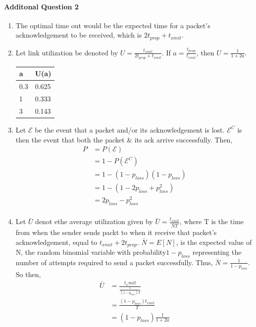 \documentclass[12pt]{article}
\begin{document}
\paragraph{Additonal Question 2}
\begin{enumerate}[label=\textbf{Part \alph*)},leftmargin=*,align=left]
	\item The optimal time out would be the expected time for a packet's acknowledgement to be received, which is $2t_{prop} + t_{xmit}$.
	\item Let link utilization be denoted by $U = \frac{t_{xmit}}{2t_{prop} + t_{xmit}}$. If $a = \frac{t_{prop}}{t_{xmit}}$, then $U = \frac{1}{1 + 2a}$. 
		\begin{tabular}{ | l | l | }
			\hline
			a & U(a) \\ \hline
			0.3 &  0.625 \\ \hline
			1    &  0.333 \\ \hline
			3    &  0.143	\\ \hline
		\end{tabular}
	\item Let $\mathcal{E}$ be the event that a packet and/or its acknowledgement is lost. $\mathcal{E}^C$ is then the event that both the packet \& its ack arrive successfully. Then,
		\begin{align*}
			P & = P (\mathcal{E}) \\
			& = 1 - P( \mathcal{E}^C) \\
			& = 1 - (1 - p_{loss})( 1 - p_{loss} ) \\
			& = 1 - ( 1 - 2p_{loss} + p_{loss}^2 ) \\
			& = 2p_{loss} - p_{loss}^2\\
		\end{align*}
	\item Let $\bar{U}$ denot ethe average utilization given by $\bar{U} = \frac{t_{xmit}}{\bar{N}T}$, where T is the time from when the sender sends packt to when it receive that packet's acknowledgement, equal to $t_{xmit} + 2t_{prop}$. $\bar{N} = E[N]$, is the expected value of N, the random binomial variable with probability$1 - p_{loss}$ representing the number of attempts required to send a packet successfully. Thus, $\bar{N} = \frac{1}{1-p_{loss}}$. So then,
		\begin{align*}
			\bar{U} & = \frac{t_xmit}{\frac{ 1 }{ (1 - p_{loss})T } } \\
				       & = \frac{ ( 1 - p_{loss})t_{xmit} }{ T } \\
				       & = ( 1 - p_{loss} )\frac{ 1 }{ 1 + 2a } \\

\end{align*}
\end{enumerate}
\end{document}
